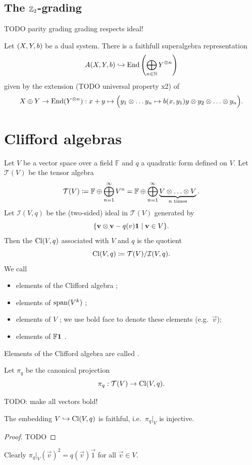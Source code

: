 \subsection{The $\mathbb{Z}_2$-grading}
TODO parity grading grading respects ideal!

\begin{proposition}
Let $\sSet{X,Y,b}$ be a dual system. There is a faithfull superalgebra representation
\[ A(X,Y,b) \hookrightarrow \operatorname{End}\left(\bigoplus_{n\in \mathbb{N}}Y^{\otimes n}\right) \]
given by the extension (TODO universal property x2) of
\[ X\oplus Y \to \operatorname{End}(Y^{\otimes n}): x+y \mapsto \Big( y_1\otimes\ldots y_n \mapsto b(x,y_1) y\otimes y_2\otimes \ldots \otimes y_n \Big). \]
\end{proposition}

\section{Clifford algebras}
\begin{definition}
Let $V$ be a vector space over a field $\mathbb{F}$ and $q$ a quadratic form defined on $V$.
Let $\mathcal{T}(V)$ be the tensor algebra
\[ \mathcal{T}(V) \coloneqq \mathbb{F}\oplus \bigoplus_{n=1}^\infty V^n = \mathbb{F}\oplus \bigoplus_{n=1}^\infty \underbrace{V\otimes \ldots \otimes V}_{\text{$n$ times}}. \]
Let $\mathcal{I}(V,q)$ be the (two-sided) ideal in $\mathcal{T}(V)$ generated by
\[ \setbuilder{\vec{v}\otimes \vec{v} - q(v) \vec{1}}{\vec{v}\in V}. \]
Then the  $\operatorname{Cl}(V,q)$ associated with $V$ and $q$ is the quotient
\[ \operatorname{Cl}(V,q) \coloneqq \mathcal{T}(V)/\mathcal{I}(V,q). \]
We call
\begin{itemize}
    \item elements of the Clifford algebra ;
    \item elements of $\operatorname{span}(V^k)$ ;
    \item elements of $V$ ; we use bold face to denote these elements (e.g.\ $\vec{v}$);
    \item elements of $\mathbb{F}\boldsymbol{\mathrm{1}}$ .
\end{itemize}
Elements of the Clifford algebra are called .
\end{definition}
Let $\pi_q$ be the canonical projection
\[ \pi_q: \mathcal{T}(V) \to \operatorname{Cl}(V,q). \]


TODO: make all vectors bold!

\begin{lemma}
The embedding $V\hookrightarrow \operatorname{Cl}(V,q)$ is faithful, i.e.\ $\pi_q|_V$ is injective.
\end{lemma}
\begin{proof}
TODO
\end{proof}
Clearly $\pi_q|_V(\vec{v})^2 = q(\vec{v}) \vec{1}$ for all $\vec{v}\in V$.

